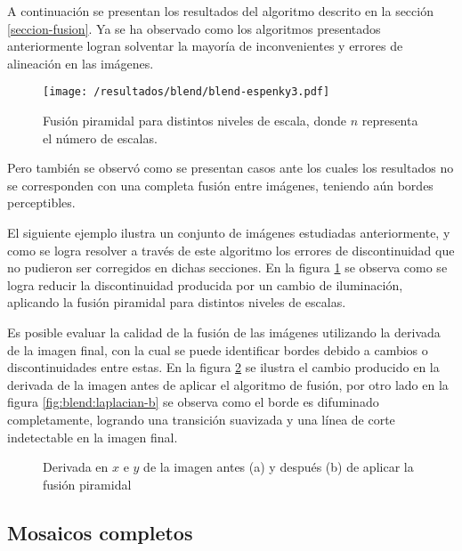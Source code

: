 A continuación se presentan los resultados del algoritmo descrito en la sección \ref{seccion-fusion}. Ya se ha observado como los algoritmos presentados anteriormente logran solventar la mayoría de inconvenientes y errores de alineación en las imágenes. \begin{figure}[H]
	\centering
	\texttt{[image: /resultados/blend/blend-espenky3.pdf]}
	\caption[Resultado de fusión pirámidal: \textit{Espenky}]{Fusión piramidal para distintos niveles de escala, donde $n$ representa el número de escalas.}
	\label{imagen:blend:espenky}
\end{figure}
Pero también se observó como se presentan casos ante los cuales los resultados no se corresponden con una completa fusión entre imágenes, teniendo aún bordes perceptibles.



El siguiente ejemplo ilustra un conjunto de imágenes estudiadas anteriormente, y como se logra resolver a través de este algoritmo los errores de discontinuidad que no pudieron ser corregidos en dichas secciones. En la figura \ref{imagen:blend:espenky} se observa como se logra reducir la discontinuidad producida por un cambio de iluminación, aplicando la fusión piramidal para distintos niveles de escalas.



Es posible evaluar la calidad de la fusión de las imágenes utilizando la derivada de la imagen final, con la cual se puede identificar bordes debido a cambios o discontinuidades entre estas. En la figura \ref{imagen:blend:laplacian} se ilustra el cambio producido en la derivada de la imagen antes de aplicar el algoritmo de fusión, por otro lado en la figura \ref{fig:blend:laplacian-b} se observa como el borde es difuminado completamente, logrando una transición suavizada y una línea de corte indetectable en la imagen final. 

\begin{figure}[H]
	\centering     %
	
	\caption[Resultado de fusión pirámidal: \textit{Espenky}]{Derivada en $x$ e $y$ de la imagen antes (a) y después (b) de aplicar la fusión piramidal}
	\label{imagen:blend:laplacian}
\end{figure}

\subsection*{Mosaicos completos}

